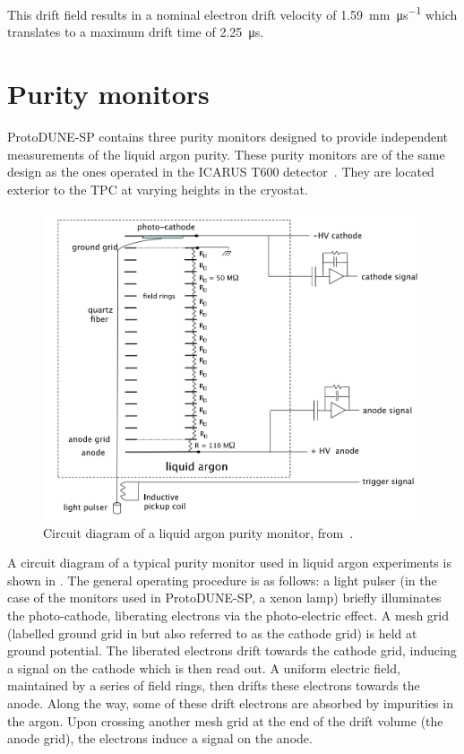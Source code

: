 This drift field results in a nominal electron drift velocity of \SI{1.59}{\mm\per\micro\second} which translates to a maximum drift time of \SI{2.25}{\micro\second}.

\section{Purity monitors}
\label{sec:protodune:prms}

ProtoDUNE-SP contains three purity monitors designed to provide independent measurements of the liquid argon purity.
These purity monitors are of the same design as the ones operated in the ICARUS T600 detector~\cite{icarus}.
They are located exterior to the TPC at varying heights in the cryostat.

\begin{figure}[h]
	\centering
	\includegraphics[width=.6\linewidth]{files/figures/protodune_detector/prmDiag}
	\caption[Circuit diagram of a typical purity monitor used in a liquid argon experiment]{Circuit diagram of a liquid argon purity monitor, from~\cite{Adamowski_2014}.}
	\label{fig:prmDiag}
\end{figure} 

A circuit diagram of a typical purity monitor used in liquid argon experiments is shown in .
The general operating procedure is as follows: a light pulser (in the case of the monitors used in ProtoDUNE-SP, a xenon lamp) briefly illuminates the photo-cathode, liberating electrons via the photo-electric effect.
A mesh grid (labelled ground grid in  but also referred to as the cathode grid) is held at ground potential.
The liberated electrons drift towards the cathode grid, inducing a signal on the cathode which is then read out.
A uniform electric field, maintained by a series of field rings, then drifts these electrons towards the anode.
Along the way, some of these drift electrons are absorbed by impurities in the argon.
Upon crossing another mesh grid at the end of the drift volume (the anode grid), the electrons induce a signal on the anode.

